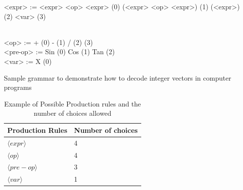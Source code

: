 \documentclass[conference]{IEEEtran}
\begin{document}
%	
%	
%	
%	


\begin{Grammar}
	\begin{grammar}
		
		
		<expr> :=  <expr> <op> <expr> \hspace{2cm} (0) 
		\alt (<expr> <op> <expr>)  \hspace{1.75cm}  (1)  
		\alt <pre-op> (<expr>) \hspace{2.2cm}  (2)  \hspace{3.9cm} (3) \\\
		
		<op> :=  + \hspace{4.4cm} (0)   \alt - \hspace{4.5cm}  (1)  \alt  /  \hspace{4.51cm}  (2) \alt * \hspace{4.45cm}  (3) \\
		
		<pre-op> := Sin \hspace{4.2cm} (0) \alt Cos
	\hspace{4.12cm} (1) \alt Tan  \hspace{4.13cm} (2) \\
		
		<var> := X  \hspace{4.4cm} (0)
		
		
	\end{grammar}
	
	\caption{Sample grammar to demonstrate how to decode integer vectors in computer programs}
	\label{gram:gramatica}
\end{Grammar}


\begin{table}[htb]
	\centering
	\caption{Example of Possible Production rules and the number of choices allowed}
	\label{tab:productionRules}
	\begin{tabular}{|l|l|}
		\hline
		Production Rules & Number of choices \\ \hline
		$\langle expr \rangle$                        & 4       \\ \hline
		$\langle op \rangle$                         & 4       \\ \hline
		$\langle pre-op \rangle$                         & 3       \\ \hline
		$\langle var \rangle$                          & 1       \\ \hline
	\end{tabular}
\end{table}
\end{document}
